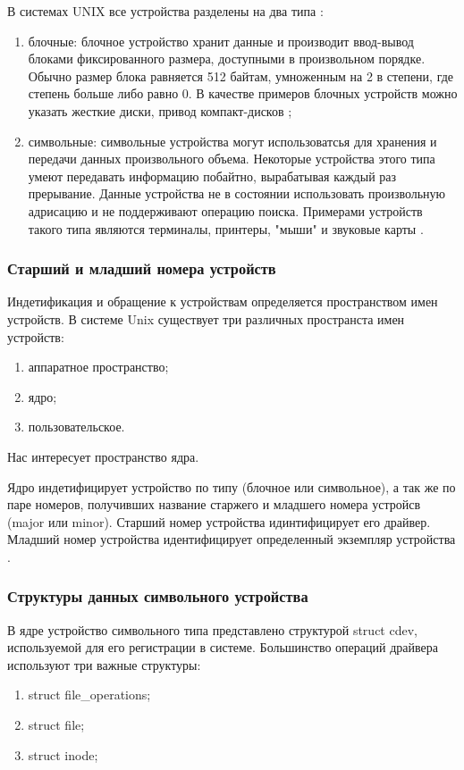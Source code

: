 В системах UNIX все устройства разделены на два типа \cite{5}:
\begin{enumerate}
	\item блочные: блочное устройство хранит данные и производит ввод-вывод блоками фиксированного размера, доступными в произвольном порядке.
	Обычно размер блока равняется 512 байтам, умноженным на 2 в степени, где степень больше либо равно 0.
	В качестве примеров блочных устройств можно указать жесткие диски, привод компакт-дисков \cite{5};
	\item символьные: символьные устройства могут использоватсья для хранения и передачи данных произвольного объема. 
	Некоторые устройства этого типа умеют передавать информацию побайтно, вырабатывая каждый раз прерывание.
	Данные устройства не в состоянии использовать произвольную адрисацию и не поддерживают операцию поиска.
	Примерами устройств такого типа являются терминалы, принтеры, "мыши" и звуковые карты \cite{5}.
\end{enumerate}

\subsubsection{Старший и младший номера устройств}
Индетификация и обращение к устройствам определяется пространством имен устройств.
В системе Unix существует три различных пространста имен устройств:
\begin{enumerate}
	\item аппаратное пространство;
	\item ядро;
	\item пользовательское.
\end{enumerate}
Нас интересует пространство ядра.

Ядро индетифицирует устройство по типу (блочное или символьное), а так же по паре номеров, получивших название старжего и младшего номера устройсв (major или minor).
Старший номер устройства идинтифицирует его драйвер. 
Младший номер устройства идентифицирует определенный экземпляр устройства \cite{5}.

\subsubsection{Структуры данных символьного устройства}
В ядре устройство символьного типа представлено структурой struct cdev, используемой для его регистрации в системе.
Большинство операций драйвера используют три важные структуры:
\begin{enumerate}
	\item struct file\_operations;
	\item struct file;
	\item struct inode;
\end{enumerate}

